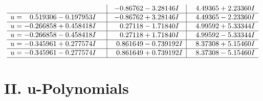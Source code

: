 \documentclass[1p]{elsarticle_modified}
\theoremstyle{definition}
\begin{document}
$$\begin{array}{c|c|c}
 & -0.86762 - 3.28146 I & \phantom{-}4.49365 + 2.23360 I \\ \hline\begin{aligned}
u &= \phantom{-}0.519306 - 0.197953 I\end{aligned}
 & -0.86762 + 3.28146 I & \phantom{-}4.49365 - 2.23360 I \\ \hline\begin{aligned}
u &= -0.266858 + 0.458418 I\end{aligned}
 & \phantom{-}0.27118 - 1.71840 I & \phantom{-}4.99592 + 5.33344 I \\ \hline\begin{aligned}
u &= -0.266858 - 0.458418 I\end{aligned}
 & \phantom{-}0.27118 + 1.71840 I & \phantom{-}4.99592 - 5.33344 I \\ \hline\begin{aligned}
u &= -0.345961 + 0.277574 I\end{aligned}
 & \phantom{-}0.861649 - 0.739192 I & \phantom{-}8.37308 + 5.15460 I \\ \hline\begin{aligned}
u &= -0.345961 - 0.277574 I\end{aligned}
 & \phantom{-}0.861649 + 0.739192 I & \phantom{-}8.37308 - 5.15460 I\\
 \hline 
 \end{array}$$\newpage
\newpage\renewcommand{\arraystretch}{1}
\centering \section*{ II. u-Polynomials}
\end{document}
